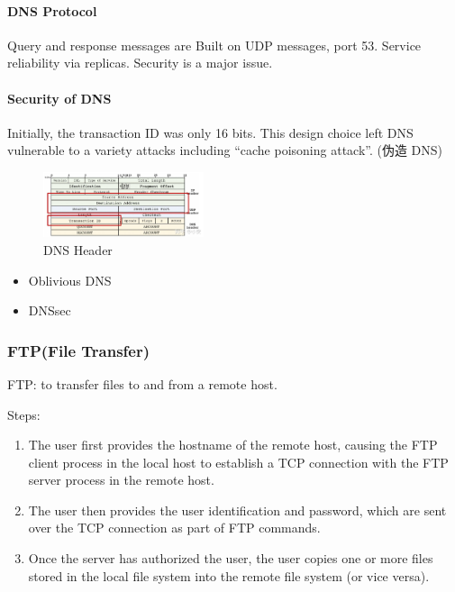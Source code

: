 \paragraph{DNS Protocol}Query and response messages are Built on UDP messages, port 53. Service reliability via replicas. Security is a major issue. 

\paragraph{Security of DNS}\quad
Initially, the transaction ID was only 16 bits. This design choice left DNS vulnerable to a variety attacks including ``cache poisoning attack''. (伪造 DNS)

\begin{figure}[!htb]
    \centering
    \includegraphics[width=0.42\textwidth]{pic/CN7/DNS Header}
    \caption{DNS Header}
\end{figure}

\begin{itemize}
    \item Oblivious DNS
    \item DNSsec
\end{itemize}

\subsubsection{FTP(File Transfer)}
FTP: to transfer files to and from a remote host. 

Steps:
\begin{enumerate}
    \item The user first provides the hostname of the remote host, causing
    the FTP client process in the local host to establish a TCP
    connection with the FTP server process in the remote host.
    \item The user then provides the user identification and password,
    which are sent over the TCP connection as part of FTP commands.
    \item Once the server has authorized the user, the user copies one or
    more files stored in the local file system into the remote file system
    (or vice versa).
\end{enumerate}

